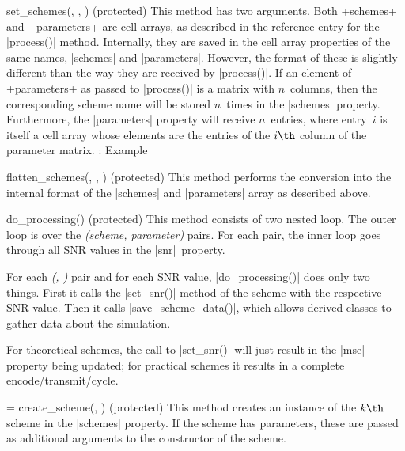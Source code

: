 \begin{method}{set_schemes(\obj, , )
  (protected)}
  This method has two arguments.
  Both +schemes+ and +parameters+ are cell arrays, as described in the
  reference entry for the |process()| method. Internally, they are saved in
  the cell array properties of the same names, |schemes| and |parameters|.
  However, the format of these is slightly different than the way they are
  received by |process()|. If an element of +parameters+ as passed to
  |process()| is a matrix with $n$~columns, then the corresponding scheme name
  will be stored $n$~times in the |schemes| property. Furthermore, the
  |parameters| property will receive $n$~entries, where entry~$i$ is itself a
  cell array whose elements are the entries of the $i\th$ column of the
  parameter matrix. \todo: Example
\end{method}

\begin{method}{flatten_schemes(\obj, , ) (protected)}
  This method performs the conversion into the internal format of the |schemes|
  and |parameters| array as described above.
\end{method}
  
\begin{method}{do_processing(\obj) (protected)}
  This method consists of two nested loop. The
  outer loop is over the \emph{(scheme, parameter)} pairs. For each pair, the
  inner loop goes through all SNR values in the |snr|~property.

  For each \emph{(, )} pair and for each SNR value,
  |do_processing()| does only two things. First it calls the |set_snr()| method
  of the scheme with the respective SNR value.     Then it calls
  |save_scheme_data()|, which allows derived classes to gather data about the
  simulation. 

  For theoretical schemes, the call to |set_snr()| will just result in the |mse|
  property being updated; for practical schemes it results in a complete
  encode\slash transmit\slash cycle.
\end{method}

\begin{method}{ = create_scheme(\obj, ) (protected)}
  This method creates an instance of the
  $k\th$ scheme in the |schemes| property. If the scheme has parameters, these
  are passed as additional arguments to the constructor of the scheme.
\end{method}
  
